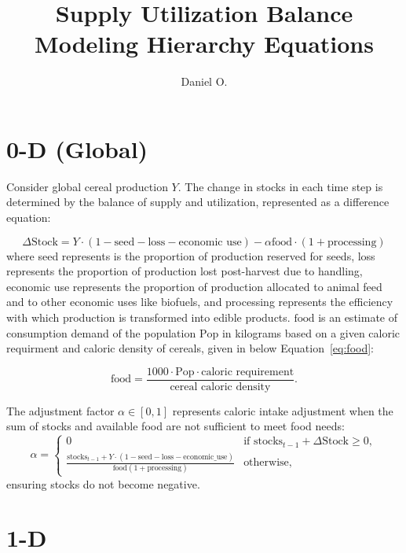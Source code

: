 \documentclass[11pt]{article}
\title{Supply Utilization Balance Modeling Hierarchy Equations}
\author{Daniel O.}
\begin{document}
\maketitle

\section{0-D (Global)}

Consider global cereal production $Y$. The change in stocks in each time step is determined by the balance of supply and utilization, represented as a difference equation:

\begin{equation}
\Delta\text{Stock} = Y \cdot (1 - \text{seed} - \text{loss} - \text{economic use})  -  \alpha \text{food} \cdot (1 + \text{processing})
\end{equation}\label{eq:0d-deltastock}
where seed represents is the proportion of production reserved for seeds, loss represents the proportion of production lost post-harvest due to handling, economic use represents the proportion of production allocated to animal feed and to other economic uses like biofuels, and processing represents the efficiency with which production is transformed into edible products. $\text{food}$ is an estimate of consumption demand of the population $\text{Pop}$ in kilograms based on a given caloric requirment and caloric density of cereals, given in below Equation~\ref{eq:food}:

\begin{equation}\label{eq:food}
\text{food} = \frac{1000 \cdot \text{Pop} \cdot \text{caloric requirement}}{\text{cereal caloric density}}.
\end{equation}

The adjustment factor $\alpha\in[0,1]$ represents caloric intake adjustment when the sum of stocks and available food are not sufficient to meet food needs: 
\begin{equation}
\alpha = 
\begin{cases} 
0 & \text{if } \text{stocks}_{t-1} + \Delta\text{Stock} \geq 0, \\ 
\frac{\text{stocks}_{t-1} + Y \cdot (1 - \text{seed} - \text{loss} -  \text{economic\_use})}{\text{food}(1 + \text{processing})} & \text{otherwise,}
\end{cases}
\end{equation}
ensuring stocks do not become negative.

\section{1-D}
 
\end{document}
